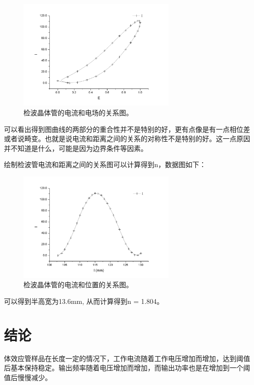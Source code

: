\documentclass[aps,pre,12pt,preprint,onecolumn,showpacs,showkeys,UTF8]{revtex4-1}
\begin{document}
\begin{figure}[ht]
	\begin{center}
		\includegraphics[width=0.7\textwidth]{pic6.png}
	\end{center}
	\caption{检波晶体管的电流和电场的关系图。}
	\label{fig:fig2}
\end{figure}

可以看出得到图曲线的两部分的重合性并不是特别的好，更有点像是有一点相位差或者说畸变。也就是说电流和距离之间的关系的对称性不是特别的好。这一点原因并不知道是什么，可能是因为边界条件等因素。

绘制检波管电流和距离之间的关系图可以计算得到n，数据图如下：
\begin{figure}[ht]
	\begin{center}
		\includegraphics[width=0.7\textwidth]{pic5.png}
	\end{center}
	\caption{检波晶体管的电流和位置的关系图。}
	\label{fig:fig2}
\end{figure}
可以得到半高宽为13.6mm, 从而计算得到n = 1.804。

\section{结论}

体效应管样品在长度一定的情况下，工作电流随着工作电压增加而增加，达到阈值后基本保持稳定。输出频率随着电压增加而增加，而输出功率也是在增加到一个阈值后慢慢减少。
\end{document}
